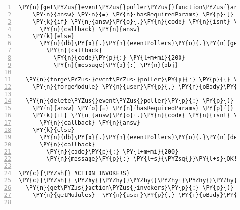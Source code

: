\begin{Verbatim}[fontsize=\scriptsize,commandchars=\\\{\},numbers=left,firstnumber=1,stepnumber=1]
  \PY{n}{get\PYZus{}event\PYZus{}poller\PYZus{}function\PYZus{}arguments}\PY{p}{:} \PY{p}{(} \PY{n}{user}\PY{p}{,} \PY{n}{oBody}\PY{p}{,} \PY{n}{callback} \PY{p}{)} \PY{o}{\PYZhy{}}\PY{o}{\PYZgt{}}
    \PY{n}{answ} \PY{o}{=} \PY{n}{hasRequiredParams} \PY{p}{[} \PY{l+s}{\PYZsq{}}\PY{l+s}{id}\PY{l+s}{\PYZsq{}} \PY{p}{]}\PY{p}{,} \PY{n}{oBody}
    \PY{k}{if} \PY{n}{answ}\PY{o}{.}\PY{n}{code} \PY{n}{isnt} \PY{l+m+mi}{200}
      \PY{n}{callback} \PY{n}{answ}
    \PY{k}{else}
      \PY{n}{db}\PY{o}{.}\PY{n}{eventPollers}\PY{o}{.}\PY{n}{getModuleField} \PY{n}{user}\PY{o}{.}\PY{n}{username}\PY{p}{,} \PY{n}{oBody}\PY{o}{.}\PY{n}{id}\PY{p}{,} \PY{l+s}{\PYZsq{}}\PY{l+s}{functionArgs}\PY{l+s}{\PYZsq{}}\PY{p}{,} \PY{p}{(} \PY{n}{err}\PY{p}{,} \PY{n}{obj} \PY{p}{)} \PY{o}{\PYZhy{}}\PY{o}{\PYZgt{}}
        \PY{n}{callback}
          \PY{n}{code}\PY{p}{:} \PY{l+m+mi}{200}
          \PY{n}{message}\PY{p}{:} \PY{n}{obj}
  
  \PY{n}{forge\PYZus{}event\PYZus{}poller}\PY{p}{:} \PY{p}{(} \PY{n}{user}\PY{p}{,} \PY{n}{oBody}\PY{p}{,} \PY{n}{callback} \PY{p}{)} \PY{o}{\PYZhy{}}\PY{o}{\PYZgt{}}
    \PY{n}{forgeModule} \PY{n}{user}\PY{p}{,} \PY{n}{oBody}\PY{p}{,} \PY{l+s}{\PYZdq{}}\PY{l+s}{eventpoller}\PY{l+s}{\PYZdq{}}\PY{p}{,} \PY{n}{db}\PY{o}{.}\PY{n}{eventPollers}\PY{p}{,} \PY{n}{callback}
 
  \PY{n}{delete\PYZus{}event\PYZus{}poller}\PY{p}{:} \PY{p}{(} \PY{n}{user}\PY{p}{,} \PY{n}{oBody}\PY{p}{,} \PY{n}{callback} \PY{p}{)} \PY{o}{\PYZhy{}}\PY{o}{\PYZgt{}}
    \PY{n}{answ} \PY{o}{=} \PY{n}{hasRequiredParams} \PY{p}{[} \PY{l+s}{\PYZsq{}}\PY{l+s}{id}\PY{l+s}{\PYZsq{}} \PY{p}{]}\PY{p}{,} \PY{n}{oBody}
    \PY{k}{if} \PY{n}{answ}\PY{o}{.}\PY{n}{code} \PY{n}{isnt} \PY{l+m+mi}{200}
      \PY{n}{callback} \PY{n}{answ}
    \PY{k}{else}
      \PY{n}{db}\PY{o}{.}\PY{n}{eventPollers}\PY{o}{.}\PY{n}{deleteModule} \PY{n}{user}\PY{o}{.}\PY{n}{username}\PY{p}{,} \PY{n}{oBody}\PY{o}{.}\PY{n}{id}
      \PY{n}{callback}
        \PY{n}{code}\PY{p}{:} \PY{l+m+mi}{200}
        \PY{n}{message}\PY{p}{:} \PY{l+s}{\PYZsq{}}\PY{l+s}{OK!}\PY{l+s}{\PYZsq{}}

\PY{c}{\PYZsh{} ACTION INVOKERS}
\PY{c}{\PYZsh{} \PYZhy{}\PYZhy{}\PYZhy{}\PYZhy{}\PYZhy{}\PYZhy{}\PYZhy{}\PYZhy{}\PYZhy{}\PYZhy{}\PYZhy{}\PYZhy{}\PYZhy{}\PYZhy{}\PYZhy{}}
  \PY{n}{get\PYZus{}action\PYZus{}invokers}\PY{p}{:} \PY{p}{(} \PY{n}{user}\PY{p}{,} \PY{n}{oBody}\PY{p}{,} \PY{n}{callback} \PY{p}{)} \PY{o}{\PYZhy{}}\PY{o}{\PYZgt{}}
    \PY{n}{getModules}  \PY{n}{user}\PY{p}{,} \PY{n}{oBody}\PY{p}{,} \PY{n}{db}\PY{o}{.}\PY{n}{actionInvokers}\PY{p}{,} \PY{n}{callback}
  

\end{Verbatim}
